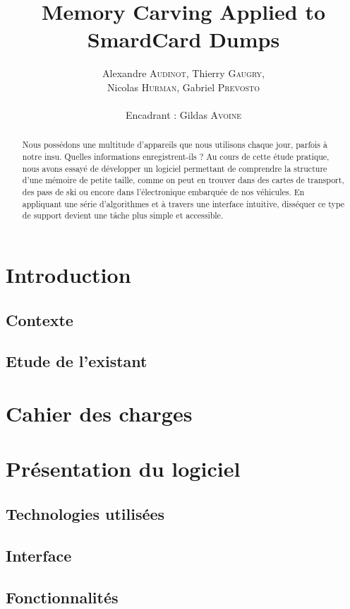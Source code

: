 \documentclass[a4paper,11pt]{article}
\title{ \textbf{Memory Carving Applied to SmardCard Dumps} }
\author{Alexandre \textsc{Audinot}, Thierry \textsc{Gaugry}, \\
        Nicolas \textsc{Hurman}, Gabriel \textsc{Prevosto} \\
        \\
        Encadrant : Gildas \textsc{Avoine}}
\date{}                    %
\begin{document}
\maketitle                 %
\thispagestyle{empty}      %



\begin{abstract}
Nous possédons une multitude d'appareils que nous utilisons chaque jour, parfois à notre insu. Quelles informations enregistrent-ils ?
Au cours de cette étude pratique, nous avons essayé de développer un logiciel permettant de comprendre la structure d'une mémoire de petite taille, comme on peut en trouver dans des cartes de transport, des pass de ski ou encore dans l'électronique embarquée de nos véhicules. En appliquant une série d'algorithmes et à travers une interface intuitive, disséquer ce type de support devient une tâche plus simple et accessible.
\end{abstract}

\section{Introduction}
  \subsection{Contexte} 
  \subsection{Etude de l'existant} 
\section{Cahier des charges}
  
\section{Présentation du logiciel}
  \subsection{Technologies utilisées} 
  \subsection{Interface} 
  \subsection{Fonctionnalités} 
\end{document}
